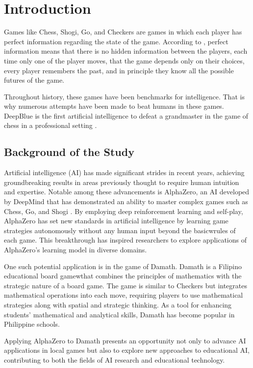 \chapter{Introduction}

Games like Chess, Shogi, Go, and Checkers are games in which each player has perfect information regarding the state of the game. According to \cite{MYCIELSKI199241}, perfect information means that there is no hidden information between the players, each time only one of the player moves, that the game depends only on their choices, every player remembers the past, and in principle they know all the possible futures of the game.

Throughout history, these games have been benchmarks for intelligence. That is why numerous attempts have been made to beat humans in these games. DeepBlue is the first artificial intelligence to defeat a grandmaster in the game of chess in a professional setting \cite{hsu2002behind}.

\section{Background of the Study}

Artificial intelligence (AI) has made significant strides in recent years, achieving groundbreaking results in areas previously thought to require human intuition and expertise. Notable among these advancements is AlphaZero, an AI developed by DeepMind that has demonstrated an ability to master complex games such as Chess, Go, and Shogi \cite{silver2017masteringchessshogiselfplay}. By employing deep reinforcement learning and self-play, AlphaZero has set new standards in artificial intelligence by learning game strategies autonomously without any human input beyond the basicwrules of each game. This breakthrough has inspired researchers to explore applications of AlphaZero’s learning model in diverse domains.

One such potential application is in the game of Damath. Damath is a Filipino educational board gamewthat combines the principles of mathematics with the strategic nature of a board game. The game is similar to Checkers but integrates mathematical operations into each move, requiring players to use mathematical strategies along with spatial and strategic thinking. As a tool for enhancing students' mathematical and analytical skills, Damath has become popular in Philippine schools. 

Applying AlphaZero to Damath presents an opportunity not only to advance AI applications in local games but also to explore new approaches to educational AI, contributing to both the fields of AI research and educational technology.

